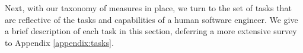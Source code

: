 Next, with our taxonomy of measures in place, we turn to the set of tasks that are reflective of the tasks and capabilities of a human software engineer. We give a brief description of each task in this section, deferring a more extensive survey to Appendix \ref{appendix:tasks}.








